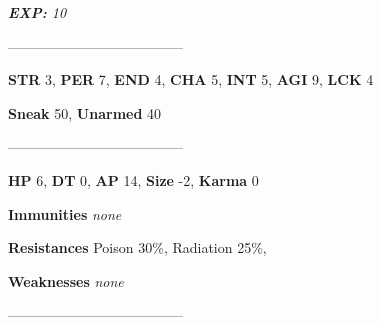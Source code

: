 \documentclass[11pt,a4paper,twocolumn]{book}
\begin{document}
	\emph{\textbf{EXP:} 10}
%	
%		
%	
%		

	--------------------------------------

\noindent
\textbf{STR} 3, \textbf{PER} 7, \textbf{END} 4, \textbf{CHA} 5, \textbf{INT} 5, \textbf{AGI} 9, \textbf{LCK} 4

\noindent
\textbf{Sneak} 50, \textbf{Unarmed} 40 %

--------------------------------------

\noindent
\textbf{HP} 6, \textbf{DT} 0, \textbf{AP} 14, \textbf{Size} -2, \textbf{Karma} 0


\noindent
\textbf{Immunities} \emph{none} %

\noindent
\textbf{Resistances} Poison 30\%, Radiation 25\%, %

\noindent
\textbf{Weaknesses} \emph{none}%

--------------------------------------	
	
\end{document}
